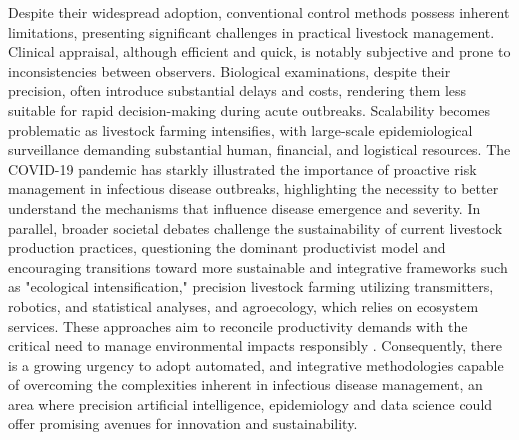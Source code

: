 Despite their widespread adoption, conventional control methods possess inherent limitations, presenting significant challenges in practical livestock management. Clinical appraisal, although efficient and quick, is notably subjective and prone to inconsistencies between observers. Biological examinations, despite their precision, often introduce substantial delays and costs, rendering them less suitable for rapid decision-making during acute outbreaks. Scalability becomes problematic as livestock farming intensifies, with large-scale epidemiological surveillance demanding substantial human, financial, and logistical resources. The COVID-19 pandemic has starkly illustrated the importance of proactive risk management in infectious disease outbreaks, highlighting the necessity to better understand the mechanisms that influence disease emergence and severity. In parallel, broader societal debates challenge the sustainability of current livestock production practices, questioning the dominant productivist model and encouraging transitions toward more sustainable and integrative frameworks such as "ecological intensification," precision livestock farming utilizing transmitters, robotics, and statistical analyses, and agroecology, which relies on ecosystem services. These approaches aim to reconcile productivity demands with the critical need to manage environmental impacts responsibly \cite{INRA_Livestock_Production}. Consequently, there is a growing urgency to adopt automated, and integrative methodologies capable of overcoming the complexities inherent in infectious disease management, an area where precision artificial intelligence, epidemiology and data science could offer promising avenues for innovation and sustainability.  



